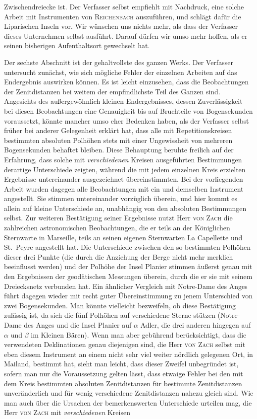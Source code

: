 Zwischendreiecke ist. Der Verfasser selbst empfiehlt mit Nachdruck, eine solche Arbeit mit Instrumenten von \textsc{Reichenbach} auszuführen, und schlägt dafür die Liparischen Inseln vor. Wir wünschen uns nichts mehr, als dass der Verfasser dieses Unternehmen selbst ausführt. Darauf dürfen wir umso mehr hoffen, als er seinen bisherigen Aufenthaltsort gewechselt hat.

Der sechste Abschnitt ist der gehaltvollste des ganzen Werks. Der Verfasser untersucht zunächst, wie sich mögliche Fehler der einzelnen Arbeiten auf das Endergebnis auswirken können. Es ist leicht einzusehen, dass die Beobachtungen der Zenitdistanzen bei weitem der empfindlichste Teil des Ganzen sind. Angesichts des außergewöhnlich kleinen Endergebnisses, dessen Zuverlässigkeit bei diesen Beobachtungen eine Genauigkeit bis auf Bruchteile von Bogensekunden voraussetzt, könnte mancher umso eher Bedenken haben, als der Verfasser selbst früher bei anderer Gelegenheit erklärt hat, dass alle mit Repetitionskreisen bestimmten absoluten Polhöhen stets mit einer Ungewissheit von mehreren Bogensekunden behaftet bleiben. Diese Behauptung beruhte freilich auf der Erfahrung, dass solche mit \emph{verschiedenen} Kreisen ausgeführten Bestimmungen derartige Unterschiede zeigten, während die mit jedem einzelnen Kreis erzielten Ergebnisse untereinander ausgezeichnet übereinstimmten. Bei der vorliegenden Arbeit wurden dagegen alle Beobachtungen mit ein und demselben Instrument angestellt. Sie stimmen untereinander vorzüglich überein, und hier kommt es allein auf kleine Unterschiede an, unabhängig von den absoluten Bestimmungen selbst. Zur weiteren Bestätigung seiner Ergebnisse nutzt Herr \textsc{von Zach} die zahlreichen astronomischen Beobachtungen, die er teils an der Königlichen Sternwarte in Marseille, teils an seinen eigenen Sternwarten La Capellette und St.\ Peyre angestellt hat. Die Unterschiede zwischen den so bestimmten Polhöhen dieser drei Punkte (die durch die Anziehung der Berge nicht mehr merklich beeinflusst werden) und der Polhöhe der Insel Planier stimmen äußerst genau mit den Ergebnissen der geodätischen Messungen überein, durch die er sie mit seinem Dreiecksnetz verbunden hat. Ein ähnlicher Vergleich mit Notre-Dame des Anges führt dagegen wieder mit recht guter Übereinstimmung zu jenem Unterschied von zwei Bogensekunden. Man könnte vielleicht bezweifeln, ob diese Bestätigung zulässig ist, da sich die fünf Polhöhen auf verschiedene Sterne stützen (Notre-Dame des Anges und die Insel Planier auf $\alpha$ Adler, die drei anderen hingegen auf $\alpha$ und $\beta$ im Kleinen Bären). Wenn man aber gebührend berücksichtigt, dass die verwendeten Deklinationen genau diejenigen sind, die Herr \textsc{von Zach} selbst mit eben diesem Instrument an einem nicht sehr viel weiter nördlich gelegenen Ort, in Mailand, bestimmt hat, sieht man leicht, dass dieser Zweifel unbegründet ist, sofern man nur die Voraussetzung gelten lässt, dass etwaige Fehler bei den mit dem Kreis bestimmten absoluten Zenitdistanzen für bestimmte Zenitdistanzen unveränderlich und für wenig verschiedene Zenitdistanzen nahezu gleich sind. Wie man auch über die Ursachen der bemerkenswerten Unterschiede urteilen mag, die Herr \textsc{von Zach} mit \emph{verschiedenen} Kreisen 